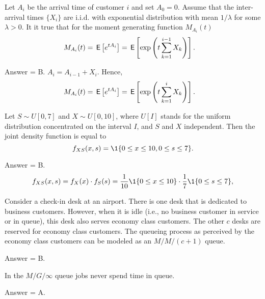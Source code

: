 \begin{exercise}[201902]
 Let $A_i$ be the arrival time of customer $i$ and set $A_0=0$.
    Assume that the inter-arrival times $\{X_i\}$ are i.i.d.  with
    exponential distribution with mean $1/\lambda$ for some
    $\lambda>0$. It it true that  for the  moment generating function $M_{A_i}(t)$
\begin{align*}
  M_{A_i}(t) &= \,\mathsf{E}\left[e^{t A_i}\right] = \,\mathsf{E}\left[\exp\left(t\sum_{k=1}^{i-1} X_k\right)\right].
\end{align*}

\begin{solution}
Answer = B. $A_i = A_{i-1} + X_i$. Hence, 
\begin{align*}
  M_{A_i}(t) &= \,\mathsf{E}\left[e^{t A_i}\right] = \,\mathsf{E}\left[\exp\left(t\sum_{k=1}^{i} X_k\right)\right].
\end{align*}
\end{solution}
\end{exercise}

\begin{exercise}[201902]
  Let $S\sim U[0,7]$ and $X\sim U[0,10]$, where $U[I]$ stands for the
  uniform distribution concentrated on the interval $I$, and $S$ and $X$ independent. Then the joint density function is equal to 
\begin{equation*}
  f_{X S}(x,s) = \1{0\leq x \leq 10, 0\leq s \leq 7}.
\end{equation*}
\begin{solution}
Answer = B. %
\begin{equation*}
  f_{X S}(x, s) = f_X(x) \cdot f_S(s) = \frac{1}{10} \1{0\leq x \leq 10}\cdot \frac 17 \1{0\leq s \leq 7},
\end{equation*}

\end{solution}
\end{exercise}

\begin{exercise}[201902]
Consider a check-in desk at an airport. There is one desk that is dedicated to  business customers. However, when it is idle (i.e., no business customer in service or in queue), this desk also serves economy class customers. The other $c$ desks are reserved for economy class customers. The queueing process as perceived by the economy class customers can be modeled as an $M/M/(c+1)$ queue. 
\begin{solution}
Answer = B. 
\end{solution}
\end{exercise}

\begin{exercise}[201902]
In the $M/G/\infty$ queue jobs never spend time in queue.
\begin{solution}
Answer = A.
\end{solution}
\end{exercise}

